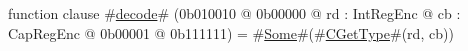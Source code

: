 function clause #\hyperref[zdecode]{decode}# (0b010010 @ 0b00000 @ rd : IntRegEnc @ cb : CapRegEnc @    0b00001 @ 0b111111) = #\hyperref[zSome]{Some}#(#\hyperref[zCGetType]{CGetType}#(rd, cb))
